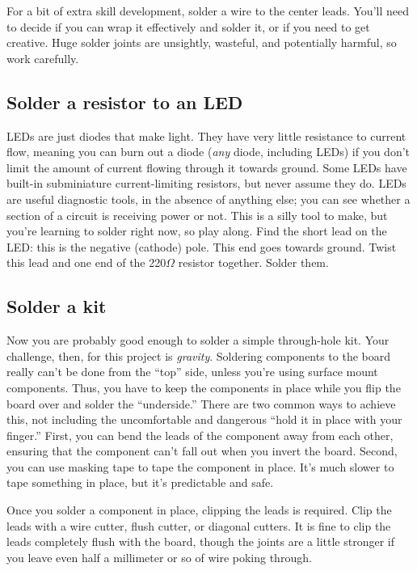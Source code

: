 \documentclass[12pt]{article}
\begin{document}
For a bit of extra skill development, solder a wire to the center leads. You'll need to decide if you can wrap it effectively and solder it, or if you need to get creative. Huge solder joints are unsightly, wasteful, and potentially harmful, so work carefully.

\subsection{Solder a resistor to an LED}

LEDs are just diodes that make light. They have very little resistance to current flow, meaning you can burn out a diode (\emph{any} diode, including LEDs) if you don't limit the amount of current flowing through it towards ground. Some LEDs have built-in subminiature current-limiting resistors, but never assume they do. LEDs are useful diagnostic tools, in the absence of anything else; you can see whether a section of a circuit is receiving power or not. This is a silly tool to make, but you're learning to solder right now, so play along. Find the short lead on the LED: this is the negative (cathode) pole. This end goes towards ground. Twist this lead and one end of the 220$\Omega$ resistor together. Solder them. 

\subsection{Solder a kit}

Now you are probably good enough to solder a simple through-hole kit. Your challenge, then, for this project is \emph{gravity}. Soldering components to the board really can't be done from the ``top'' side, unless you're using surface mount components. Thus, you have to keep the components in place while you flip the board over and solder the ``underside.'' There are two common ways to achieve this, not including the uncomfortable and dangerous ``hold it in place with your finger.'' First, you can bend the leads of the component away from each other, ensuring that the component can't fall out when you invert the board. Second, you can use masking tape to tape the component in place. It's much slower to tape something in place, but it's predictable and safe.

Once you solder a component in place, clipping the leads is required. Clip the leads with a wire cutter, flush cutter, or diagonal cutters. It is fine to clip the leads completely flush with the board, though the joints are a little stronger if you leave even half a millimeter or so of wire poking through. 
\end{document}
